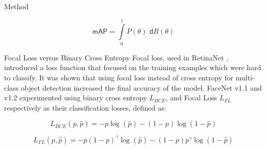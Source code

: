 \documentclass[paperwidth=24in,paperheight=48in, fontscale=0.4166666666666]{baposter}
\begin{document}
\begin{poster}
\begin{posterbox}[name=method,column=0,below=background]{Method}
\vspace{-14pt}

\begin{equation}
\textsf{mAP} = \int \limits^1_0 P(\theta) \hspace{4pt} \textsf{d}R(\theta) 
\end{equation}

\vspace{-6pt}

\end{posterbox}














\begin{posterbox}[name=zeropad,column=0,below=method, above=bottom]{Focal Loss versus Binary Cross Entropy}
Focal loss, used in RetinaNet \cite{retinanet}, introduced a loss function that focused on the training examples which were hard to classify. It was shown that using focal loss instead of cross entropy for multi-class object detection increased the final accuracy of the model. FaceNet v1.1 and v1.2 experimented using binary cross entropy $L_{BCE}$, and Focal Loss $L_{FL}$ respectively as their classification losses, defined as:

\begin{equation}
L_{BCE}(p, \hat{p}) = -p \log{(\hat{p})} -(1-p) \log{(1-\hat{p})}
\end{equation}

\begin{equation}
L_{FL}(p, \hat{p}) = -p (1-p)^\gamma \log{(\hat{p})} -(1-p) p^\gamma\log{(1-\hat{p})}
\end{equation}
\vspace{-3pt}

\begin{minipage}{0.57\linewidth}
   \centering
   \label{tabseqmnist}
\end{minipage}
\begin{minipage}{0.38\linewidth}
\end{minipage}


\end{posterbox}
\end{poster}
\end{document}
